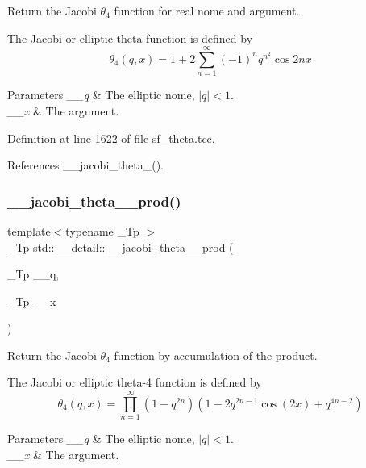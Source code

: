 Return the Jacobi $ \theta_4 $ function for real nome and argument.

The Jacobi or elliptic theta function is defined by \[ \theta_4(q,x) = 1 + 2\sum_{n=1}^{\infty}(-1)^n q^{n^2}\cos{2nx} \]


\begin{DoxyParams}{Parameters}
{\em \+\_\+\+\_\+q} & The elliptic nome, $ |q| < 1 $. \\
\hline
{\em \+\_\+\+\_\+x} & The argument. \\
\hline
\end{DoxyParams}


Definition at line 1622 of file sf\+\_\+theta.\+tcc.



References \+\_\+\+\_\+jacobi\+\_\+theta\+\_().

\mbox{\label{namespacestd_1_1____detail_a577345a46215dd84c03eb4c760dbf7f4}} 
\subsubsection{\texorpdfstring{\+\_\+\+\_\+jacobi\+\_\+theta\+\_\+\_\+prod()}{\_\_jacobi\_theta\_4\_prod()}}
{\footnotesize\ttfamily template$<$typename \+\_\+\+Tp $>$ \\
\+\_\+\+Tp std\+::\+\_\+\+\_\+detail\+::\+\_\+\+\_\+jacobi\+\_\+theta\+\_\+\_\+prod (\begin{DoxyParamCaption}\item[{\+\_\+\+Tp}]{\+\_\+\+\_\+q,  }\item[{\+\_\+\+Tp}]{\+\_\+\+\_\+x }\end{DoxyParamCaption})}

Return the Jacobi $ \theta_4 $ function by accumulation of the product.

The Jacobi or elliptic theta-\/4 function is defined by \[ \theta_4(q,x) = \prod_{n=1}^{\infty} (1 - q^{2n})(1 - 2q^{2n-1}\cos(2x) + q^{4n-2}) \]


\begin{DoxyParams}{Parameters}
{\em \+\_\+\+\_\+q} & The elliptic nome, $ |q| < 1 $. \\
\hline
{\em \+\_\+\+\_\+x} & The argument. \\
\hline
\end{DoxyParams}


